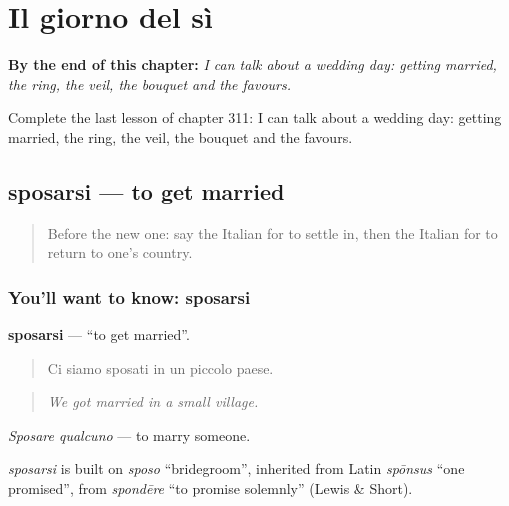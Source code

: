 
\chapter{Il giorno del sì}
\label{ch:it-il-giorno-del-si}

\begin{chapteropening}
\textbf{By the end of this chapter:} \emph{I can talk about a wedding day: getting married, the ring, the veil, the bouquet and the favours.}

Complete the last lesson of chapter 311: I can talk about a wedding day: getting married, the ring, the veil, the bouquet and the favours.
\end{chapteropening}

\section[sposarsi]{sposarsi — to get married}

\label{lesson:IT-C311-sposarsi}



\begin{quote}
Before the new one: say the Italian for to settle in, then the Italian for to return to one's country.
\end{quote}

\subsection*{You'll want to know: sposarsi}
\textbf{sposarsi} — \textquotedblleft{}to get married\textquotedblright{}.

\begin{quote}
Ci siamo sposati in un piccolo paese.
\end{quote}

\begin{quote}
\emph{We got married in a small village.}
\end{quote}

\emph{Sposare qualcuno} — to marry someone.

\begin{cousinweb}
\emph{sposarsi} is built on \emph{sposo} \textquotedblleft{}bridegroom\textquotedblright{}, inherited from Latin \emph{spōnsus} \textquotedblleft{}one promised\textquotedblright{}, from \emph{spondēre} \textquotedblleft{}to promise solemnly\textquotedblright{} (Lewis \& Short).
\end{cousinweb}

